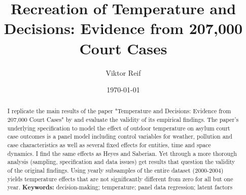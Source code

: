 \documentclass[11pt]{article}
\title{Recreation of Temperature and Decisions: Evidence from 207,000
	Court Cases}
\author{Viktor Reif}
\date{\today}
\begin{document}
	\maketitle
	
	
	\begin{abstract}
		\singlespacing
		\noindent 
		I replicate the main results of the paper "Temperature and Decisions: Evidence from 207,000 Court Cases" by \cite{Heyes.2019} and evaluate the validity of its empirical findings. The paper's underlying specification to model the effect of outdoor temperature on asylum court case outcomes is a panel model including control variables for weather, pollution and case characteristics as well as several fixed effects for entities, time and space dynamics. I find the same effects as Heyes and Saberian. Yet through a more thorough analysis (sampling, specification and data issues) get results that question the validity of the original findings. Using yearly subsamples of the entire dataset (2000-2004) yields temperature effects that are not significantly different from zero for all but one year.
		\newline \noindent \textbf{Keywords:} decision-making; temperature; panel data regression; latent factors
	\end{abstract} \newpage

	
	
\end{document}
